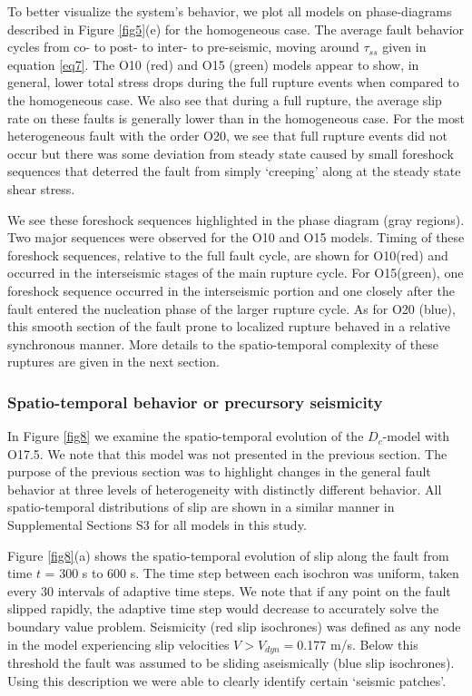 \documentclass[preprint,1p, 10pt,authoryear]{elsarticle}
\begin{document}
To better visualize the system's behavior, we plot all models on phase-diagrams described in Figure \ref{fig5}(e) for the homogeneous case. The average fault behavior cycles from co- to post- to inter- to pre-seismic, moving around $\tau_{ss}$ given in equation \eqref{eq7}. The O10 (red) and O15 (green) models appear to show, in general, lower total stress drops during the full rupture events when compared to the homogeneous case.  We also see that during a full rupture, the average slip rate on these faults is generally lower than in the homogeneous case.  For the most heterogeneous fault with the order O20, we see that full rupture events did not occur but there was some deviation from steady state caused by small foreshock sequences that deterred the fault from simply `creeping' along at the steady state shear stress. 

We see these foreshock sequences highlighted in the phase diagram (gray regions). Two major sequences were observed for the O10 and O15 models. Timing of these foreshock sequences, relative to the full fault cycle, are shown for O10(red) and occurred in the interseismic stages of the main rupture cycle. For O15(green), one foreshock sequence occurred in the interseismic portion and one closely after the fault entered the nucleation phase of the larger rupture cycle. As for O20 (blue), this smooth section of the fault prone to localized rupture behaved in a relative synchronous manner. More details to the spatio-temporal complexity of these ruptures are given in the next section. 

\subsubsection{Spatio-temporal behavior or precursory seismicity }
\label{spatialmodel}

In Figure \ref{fig8} we examine the spatio-temporal evolution of the $D_{c}$-model with O17.5. We note that this model was not presented in the previous section. The purpose of the previous section was to highlight changes in the general fault behavior at three levels of heterogeneity  with distinctly different behavior. All spatio-temporal distributions of slip are shown in a similar manner in Supplemental Sections S3 for all models in this study.

Figure \ref{fig8}(a) shows the spatio-temporal evolution of slip along the fault from time $t$ = 300 s to 600 s. The time step between each isochron was uniform, taken every 30 intervals of adaptive time steps.  We note that if any point on the fault slipped rapidly, the adaptive time step would decrease to accurately solve the boundary value problem. Seismicity (red slip isochrones) was defined as any node in the model experiencing slip velocities $V > V_{dyn}=$0.177 m/s. Below this threshold the fault was assumed to be sliding aseismically (blue slip isochrones). Using this description we were able to clearly identify certain `seismic patches'.
\end{document}
